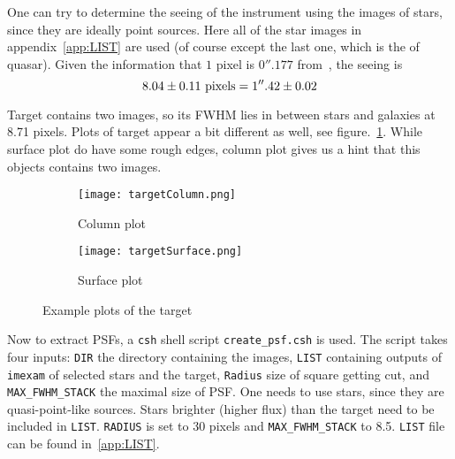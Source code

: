 One can try to determine the seeing of the instrument using the images of stars, since they are ideally point sources. Here all of the star images in appendix~\ref{app:LIST} are used (of course except the last one, which is the of quasar). Given the information that $1$ pixel is $0''.177$ from~\cite{manual}, the seeing is
\begin{equation}
	\num{8.04 +- 0.11} \text{ pixels} = 1''.42 \pm 0.02
\end{equation}

Target contains two images, so its FWHM lies in between stars and galaxies at \num{8.71} pixels. Plots of target appear a bit different as well, see figure.~\ref{fig:targetPlots}. While surface plot do have some rough edges, column plot gives us a hint that this objects contains two images.
\begin{figure}[ht]
   \centering
   \begin{subfigure}[t]{0.5\textwidth}
   \begin{center}
   \texttt{[image: targetColumn.png]}
   \end{center}
   \caption{Column plot}
   \end{subfigure}%
   \begin{subfigure}[t]{0.5\textwidth}
   \begin{center}
   \texttt{[image: targetSurface.png]}
   \end{center}
   \caption{Surface plot}
   \end{subfigure}
   \caption{Example plots of the target}%
   \label{fig:targetPlots}
\end{figure}

Now to extract PSFs, a \verb|csh| shell script \verb|create_psf.csh| is used. The script takes four inputs: \verb|DIR| the directory containing the images, \verb|LIST| containing outputs of \verb|imexam| of selected stars and the target, \verb|Radius| size of square getting cut, and \verb|MAX_FWHM_STACK| the maximal size of PSF. One needs to use stars, since they are quasi-point-like sources. Stars brighter (higher flux) than the target need to be included in \verb|LIST|. \verb|RADIUS| is set to \num{30} pixels and \verb|MAX_FWHM_STACK| to \num{8.5}. \verb|LIST| file can be found in~\ref{app:LIST}.

